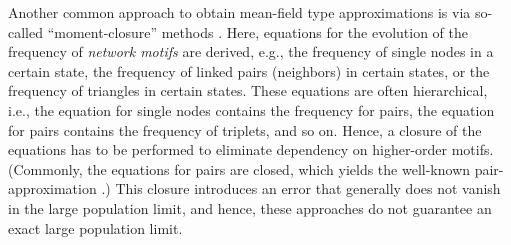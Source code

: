 \documentclass[a4paper,
               10pt,
               pdftex,
               normalheadings,
               headsepline,
               footsepline,
               headinclude,
               footinclude,
               DIV=14,
               abstracton]
{scrartcl}
\begin{document}
Another common approach to obtain mean-field type approximations is via so-called ``moment-closure'' methods \cite{miller2014, Porter2016}. Here, equations for the evolution of the frequency of \textit{network motifs} are derived, e.g., the frequency of single nodes in a certain state, the frequency of linked pairs (neighbors) in certain states, or the frequency of triangles in certain states.
These equations are often hierarchical, i.e., the equation for single nodes contains the frequency for pairs, the equation for pairs contains the frequency of triplets, and so on. Hence, a closure of the equations has to be performed to eliminate dependency on higher-order motifs. (Commonly, the equations for pairs are closed, which yields the well-known pair-approximation \cite{Pugliese2009, Peralta2018, Vieira2020}.) This closure introduces an error that generally does not vanish in the large population limit, and hence, these approaches do not guarantee an exact large population limit.
\end{document}
